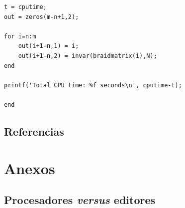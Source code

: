 \documentclass{book}
\begin{document}
{{{{{{{{{{{{{{{{{{{\begin{mdframed}[linewidth=.5pt,linecolor=black!30,roundcorner=3pt,backgroundcolor=yellow!15]
\begin{lstlisting}[Octave,caption={Ejemplo de 16 líneas de código en Octave.},captionpos=b]
t = cputime;
out = zeros(m-n+1,2);

for i=n:m
	out(i+1-n,1) = i;
	out(i+1-n,2) = invar(braidmatrix(i),N);
end

printf('Total CPU time: %f seconds\n', cputime-t);

end
\end{lstlisting}
\end{mdframed}

\backmatter

\printglossaries
{}
\label{comienzo-glosario}

\newgeometry{\textwidth + \marginparsep + \marginparwidth}
\chapter{Referencias}
\label{comienzo-bibliografia}

\printbibliography[keyword=usados,heading=none]


\newpage
\raggedright
{}

\clearpage
{}
\printindex[autores]
\label{comienzo-autores}

\clearpage
{}
\printindex[apellidos]
\label{comienzo-apellidos}

\clearpage
{}
\printindex[conceptos]
\label{comienzo-claves}

\restoregeometry
\mainmatter
\justifying
\appendix

\part{Anexos}

\chapter{Procesadores \emph{versus} editores \label{apenB}}

}}}}}}}}}}}}}}}}}}}
\end{document}
